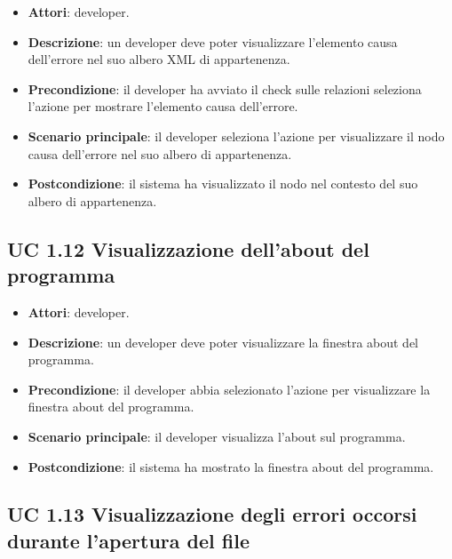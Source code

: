 		\begin{itemize}
			\item\textbf{Attori}: developer.
			\item\textbf{Descrizione}: un developer deve poter visualizzare l'elemento causa dell'errore nel suo albero XML di appartenenza.
			\item\textbf{Precondizione}: il developer ha avviato il check sulle relazioni seleziona l'azione per mostrare l'elemento causa dell'errore.
			\item\textbf{Scenario principale}: il developer seleziona l'azione per visualizzare il nodo causa dell'errore nel suo albero di appartenenza.
			\item\textbf{Postcondizione}: il sistema ha visualizzato il nodo nel contesto del suo albero di appartenenza.
		\end{itemize}
		
	\subsection{UC 1.12 Visualizzazione dell'about del programma}
		\label{subsec:XEUC1.12}
		
		\begin{itemize}
			\item\textbf{Attori}: developer.
			\item\textbf{Descrizione}: un developer deve poter visualizzare la finestra about del programma.
			\item\textbf{Precondizione}: il developer abbia selezionato l'azione per visualizzare la finestra about del programma.
			\item\textbf{Scenario principale}: il developer visualizza l'about sul programma.
			\item\textbf{Postcondizione}: il sistema ha mostrato la finestra about del programma.
		\end{itemize}
		
	\subsection{UC 1.13 Visualizzazione degli errori occorsi durante l'apertura del file}
		\label{subsec:XEUC1.13}
		
